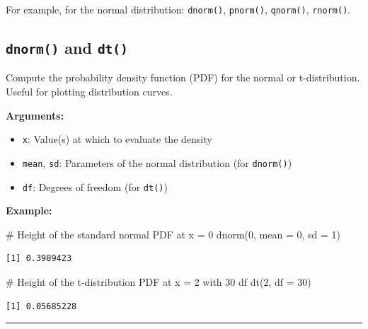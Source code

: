 \documentclass[
  letterpaper,
  DIV=11,
  numbers=noendperiod]{scrreprt}
\newenvironment{Shaded}{\begin{snugshade}}{\end{snugshade}}
\newcommand{\AttributeTok}[1]{\textcolor[rgb]{0.40,0.45,0.13}{#1}}
\newcommand{\CommentTok}[1]{\textcolor[rgb]{0.37,0.37,0.37}{#1}}
\newcommand{\DecValTok}[1]{\textcolor[rgb]{0.68,0.00,0.00}{#1}}
\newcommand{\FunctionTok}[1]{\textcolor[rgb]{0.28,0.35,0.67}{#1}}
\newcommand{\NormalTok}[1]{\textcolor[rgb]{0.00,0.23,0.31}{#1}}
\providecommand{\tightlist}{%
  \setlength{\itemsep}{0pt}\setlength{\parskip}{0pt}}
\begin{document}
For example, for the normal distribution: \texttt{dnorm()},
\texttt{pnorm()}, \texttt{qnorm()}, \texttt{rnorm()}.

\subsection{\texorpdfstring{\texttt{dnorm()} and
\texttt{dt()}}{dnorm() and dt()}}\label{dnorm-and-dt}

Compute the probability density function (PDF) for the normal or
t-distribution. Useful for plotting distribution curves.

\textbf{Arguments:}

\begin{itemize}
\tightlist
\item
  \texttt{x}: Value(s) at which to evaluate the density
\item
  \texttt{mean}, \texttt{sd}: Parameters of the normal distribution (for
  \texttt{dnorm()})
\item
  \texttt{df}: Degrees of freedom (for \texttt{dt()})
\end{itemize}

\textbf{Example:}

\begin{Shaded}
\begin{Highlighting}[]
\CommentTok{\# Height of the standard normal PDF at x = 0}
\FunctionTok{dnorm}\NormalTok{(}\DecValTok{0}\NormalTok{, }\AttributeTok{mean =} \DecValTok{0}\NormalTok{, }\AttributeTok{sd =} \DecValTok{1}\NormalTok{)}
\end{Highlighting}
\end{Shaded}

\begin{verbatim}
[1] 0.3989423
\end{verbatim}

\begin{Shaded}
\begin{Highlighting}[]
\CommentTok{\# Height of the t{-}distribution PDF at x = 2 with 30 df}
\FunctionTok{dt}\NormalTok{(}\DecValTok{2}\NormalTok{, }\AttributeTok{df =} \DecValTok{30}\NormalTok{)}
\end{Highlighting}
\end{Shaded}

\begin{verbatim}
[1] 0.05685228
\end{verbatim}

\begin{center}\rule{0.5\linewidth}{0.5pt}\end{center}
\end{document}
